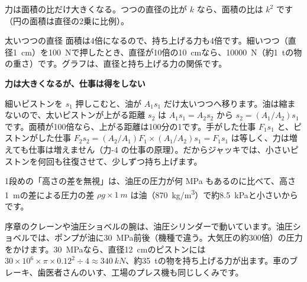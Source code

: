 \begin{phyomi}[$F_2=(A_2/A_1)F_1$]
力は面積の比だけ大きくなる。つつの直径の比が $k$ なら、面積の比は $k^2$ です（円の面積は直径の2乗に比例）。
\end{phyomi}
\begin{phbaisuru}{太いつつの直径}
面積は4倍になるので、持ち上げる力も4倍です。細いつつ（直径\qty{1}{cm}）を\qty{100}{N}で押したとき、直径が10倍の\qty{10}{cm}なら、\qty{10000}{N}（約\qty{1}{t}の物の重さ）です。グラフは、直径と持ち上げる力の関係です。
\par\vspace{2pt}\centering
{}
\end{phbaisuru}

\noindent\textbf{力は大きくなるが、仕事は得をしない}\par\nobreak
細いピストンを $s_1$ 押しこむと、油が $A_1s_1$ だけ太いつつへ移ります。油は縮まないので、太いピストンが上がる距離 $s_2$ は $A_1s_1=A_2s_2$ から $s_2=(A_1/A_2)s_1$ です。面積が100倍なら、上がる距離は100分の1です。手がした仕事 $F_1s_1$ と、ピストンがした仕事 $F_2s_2=(A_2/A_1)F_1\times(A_1/A_2)s_1=F_1s_1$ は等しく、力は増えても仕事は増えません（力-4 の仕事の原理）。だからジャッキでは、小さいピストンを何回も往復させて、少しずつ持ち上げます。
\begin{phflow}
\end{phflow}
1段めの「高さの差を無視」は、油圧の圧力が何 MPa もあるのに比べて、高さ\qty{1}{m}の差による圧力の差 $\rho g\times\qty{1}{m}$ は油（\qty{870}{kg/m^3}）で約\qty{8.5}{kPa}と小さいからです。
\begin{phmijika}[クレーンの腕を持ち上げる]
序章のクレーンや油圧ショベルの腕は、油圧シリンダーで動いています。油圧ショベルでは、ポンプが油に\qty{30}{MPa}前後（機種で違う。大気圧の約300倍）の圧力をかけます。\qty{30}{MPa}なら、直径\qty{12}{cm}のピストンには $30\times10^6\times\pi\times0.12^2\div 4\approx\qty{340}{kN}$、約\qty{35}{t}の物を持ち上げる力が出ます。車のブレーキ、歯医者さんのいす、工場のプレス機も同じしくみです。
\end{phmijika}

